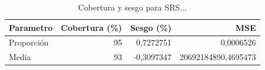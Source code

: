 \begin{table}

\caption{Cobertura y sesgo para SRS...}
\centering
\begin{tabular}[t]{lrrr}
\toprule
Parametro & Cobertura (\%) & Sesgo (\%) & MSE\\
\midrule
Proporción & 95 & 0,7272751 & 0,0006526\\
Media & 93 & -0,3097347 & 20692184890,4695473\\
\bottomrule
\end{tabular}
\end{table}
